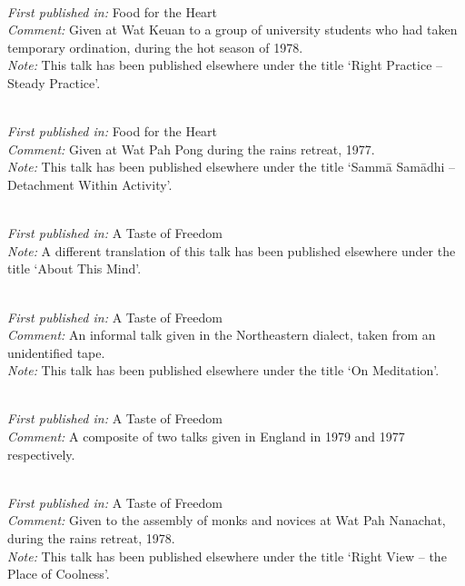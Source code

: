  \\
\textit{First published in:} Food for the Heart \\
\textit{Comment:} Given at Wat Keuan to a group of university students who had taken temporary ordination, during the hot season of 1978. \\
\textit{Note:} This talk has been published elsewhere under the title `Right Practice -- Steady Practice'.

\clearpage

 \\
\textit{First published in:} Food for the Heart \\
\textit{Comment:} Given at Wat Pah Pong during the rains retreat, 1977. \\
\textit{Note:} This talk has been published elsewhere under the title `Samm\={a} Sam\={a}dhi -- Detachment Within Activity'.

 \\
\textit{First published in:} A Taste of Freedom \\
\textit{Note:} A different translation of this talk has been published elsewhere under the title `About This Mind'.

 \\
\textit{First published in:} A Taste of Freedom \\
\textit{Comment:} An informal talk given in the Northeastern dialect, taken from an unidentified tape. \\
\textit{Note:} This talk has been published elsewhere under the title `On Meditation'.

 \\
\textit{First published in:} A Taste of Freedom \\
\textit{Comment:} A composite of two talks given in England in 1979 and 1977 respectively.

 \\
\textit{First published in:} A Taste of Freedom \\
\textit{Comment:} Given to the assembly of monks and novices at Wat Pah Nanachat, during the rains retreat, 1978. \\
\textit{Note:} This talk has been published elsewhere under the title `Right View -- the Place of Coolness'.

\clearpage

